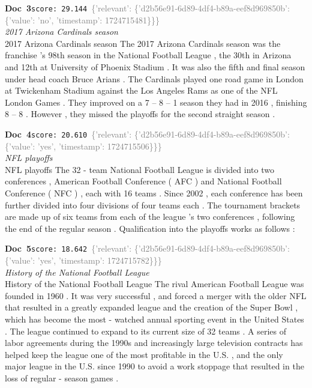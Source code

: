 \documentclass[a4paper,11pt]{article}
\begin{document}
\begin{docenv}
{\footnotesize\textcolor{doccolor}{\textbf{Doc~3}}}\hfill{\tiny\texttt{score:~29.144}}\ {\tiny\textcolor{gray}{\{'relevant': \{'d2b56e91-6d89-4df4-b89a-eef8d969850b': \{'value': 'no', 'timestamp': 1724715481\}\}\}}}\\[3pt]
{\small\textit{2017 Arizona Cardinals season}}\\[2pt]
\vspace{2pt}
{\footnotesize 2017 Arizona Cardinals season
The 2017 Arizona Cardinals season was the franchise 's 98th season in the National Football League , the 30th in Arizona and 12th at University of Phoenix Stadium . It was also the fifth and final season under head coach Bruce Arians . The Cardinals played one road game in London at Twickenham Stadium against the Los Angeles Rams as one of the NFL London Games . They improved on a 7 -- 8 -- 1 season they had in 2016 , finishing 8 -- 8 . However , they missed the playoffs for the second straight season .}
\end{docenv}
\begin{docenv}
{\footnotesize\textcolor{doccolor}{\textbf{Doc~4}}}\hfill{\tiny\texttt{score:~20.610}}\ {\tiny\textcolor{gray}{\{'relevant': \{'d2b56e91-6d89-4df4-b89a-eef8d969850b': \{'value': 'yes', 'timestamp': 1724715506\}\}\}}}\\[3pt]
{\small\textit{NFL playoffs}}\\[2pt]
\vspace{2pt}
{\footnotesize NFL playoffs
The 32 - team National Football League is divided into two conferences , American Football Conference ( AFC ) and National Football Conference ( NFC ) , each with 16 teams . Since 2002 , each conference has been further divided into four divisions of four teams each . The tournament brackets are made up of six teams from each of the league 's two conferences , following the end of the regular season . Qualification into the playoffs works as follows :}
\end{docenv}
\begin{docenv}
{\footnotesize\textcolor{doccolor}{\textbf{Doc~5}}}\hfill{\tiny\texttt{score:~18.642}}\ {\tiny\textcolor{gray}{\{'relevant': \{'d2b56e91-6d89-4df4-b89a-eef8d969850b': \{'value': 'yes', 'timestamp': 1724715782\}\}\}}}\\[3pt]
{\small\textit{History of the National Football League}}\\[2pt]
\vspace{2pt}
{\footnotesize History of the National Football League
The rival American Football League was founded in 1960 . It was very successful , and forced a merger with the older NFL that resulted in a greatly expanded league and the creation of the Super Bowl , which has become the most - watched annual sporting event in the United States . The league continued to expand to its current size of 32 teams . A series of labor agreements during the 1990s and increasingly large television contracts has helped keep the league one of the most profitable in the U.S. , and the only major league in the U.S. since 1990 to avoid a work stoppage that resulted in the loss of regular - season games .}
\end{docenv}
\end{document}
